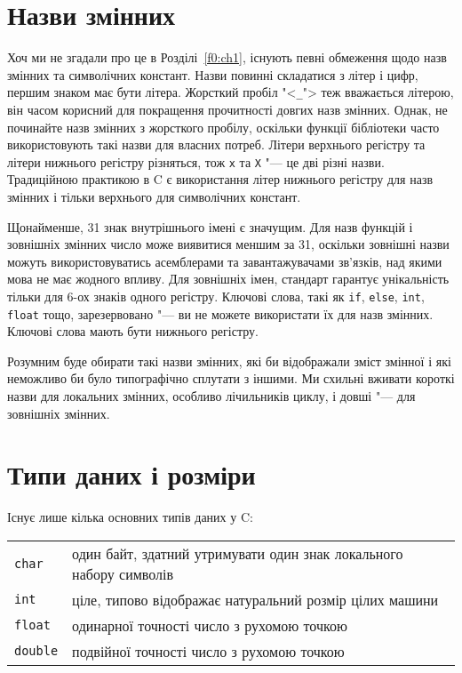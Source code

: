 \documentclass[a4paper,12pt]{book}
\begin{document}
\section{Назви змінних}


  Хоч ми не згадали про це в Розділі~\ref{f0:ch1}, існують певні обмеження щодо
  назв змінних та символічних констант. Назви повинні складатися з літер і цифр, першим
  знаком має бути літера. Жорсткий пробіл "<\texttt{\_}"> теж вважається
  літерою, він часом корисний для покращення прочитності довгих назв змінних. Однак, не
  починайте назв змінних з жорсткого пробілу, оскільки функції бібліотеки часто використовують
  такі назви для власних потреб. Літери верхнього регістру та літери нижнього регістру
  різняться, тож \texttt{x} та \texttt{X} "--- це дві різні назви. Традиційною
  практикою в C є використання літер нижнього регістру для назв змінних і тільки верхнього
  для символічних констант.

  Щонайменше, 31 знак внутрішнього імені є значущим. Для назв функцій і зовнішніх змінних
  число може виявитися меншим за 31, оскільки зовнішні назви можуть використовуватись
  асемблерами та завантажувачами зв'язків, над якими мова не має жодного впливу. Для
  зовнішніх імен, стандарт гарантує унікальність тільки для 6-ох знаків одного регістру.
  Ключові слова, такі як \texttt{if}, \texttt{else}, \texttt{int}, \texttt{float} тощо,
  зарезервовано "--- ви не можете використати їх для назв змінних. Ключові слова мають
  бути нижнього регістру.

  Розумним буде обирати такі назви змінних, які би відображали зміст змінної і які
  неможливо би було типографічно сплутати з іншими. Ми схильні вживати короткі назви для
  локальних змінних, особливо лічильників циклу, і довші "--- для зовнішніх змінних.

\section{Типи даних і розміри}


  Існує лише кілька основних типів даних у C:

  \begin{center}
  \begin{tabular}{lp{12cm}}
  \texttt{char} & один байт, здатний утримувати один знак локального набору символів \\
  \texttt{int} & ціле, типово відображає натуральний розмір цілих машини \\
  \texttt{float} & одинарної точності число з рухомою точкою \\
  \texttt{double} & подвійної точності число з рухомою точкою
  \end{tabular}
  \end{center}
\end{document}
